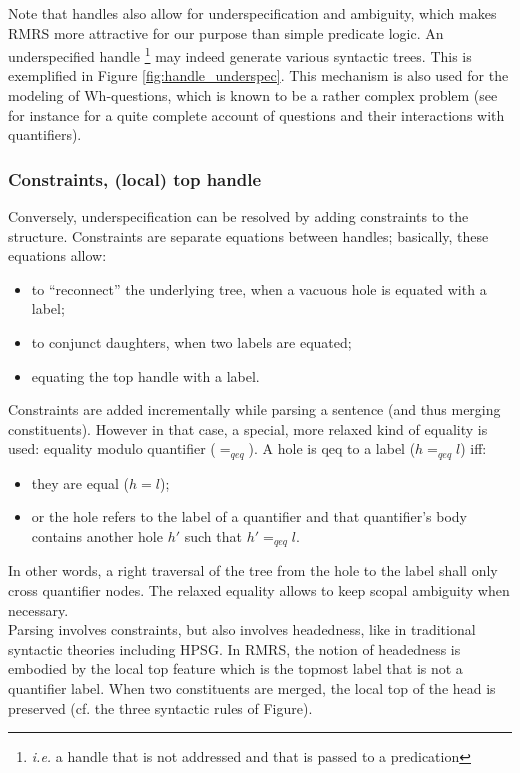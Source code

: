 \documentclass[11pt]{article}
\begin{document}
				Note that handles also allow for underspecification and ambiguity, which makes RMRS more attractive for our purpose than simple predicate logic. An underspecified handle \footnote{\textit{i.e.} a handle that is not addressed and that is passed to a predication} may indeed generate various syntactic trees. This is exemplified in Figure \ref{fig:handle_underspec}. This mechanism is also used for the modeling of Wh-questions, which is known to be a rather complex problem (see for instance \cite{egg1998} for a quite complete account of questions and their interactions with quantifiers).
			\subsubsection{Constraints, (local) top handle}
				Conversely, underspecification can be resolved by adding constraints to the structure. Constraints are separate equations between handles; basically, these equations allow:
				\begin{itemize}
					\item to ``reconnect'' the underlying tree, when a vacuous hole is equated with a label; \vspace{-2mm}
					\item to conjunct daughters, when two labels are equated; \vspace{-2mm}
					\item equating the top handle with a label.
				\end{itemize}
				Constraints are added incrementally while parsing a sentence (and thus merging constituents). However in that case, a special, more relaxed kind of equality is used: equality modulo quantifier ($=_{qeq}$). A hole is qeq to a label ($h=_{qeq}l$) iff:
				\begin{itemize}
					\item they are equal ($h = l$); \vspace{-2mm}
					\item or the hole refers to the label of a quantifier and that quantifier's body contains another hole $h'$ such that $h'=_{qeq} l$.
				\end{itemize}
				In other words, a right traversal of the tree from the hole to the label shall only cross quantifier nodes. The relaxed equality allows to keep scopal ambiguity when necessary.\\
				Parsing involves constraints, but also involves headedness, like in traditional syntactic theories including HPSG. In RMRS, the notion of headedness is embodied by the local top feature which is the topmost label that is not a quantifier label. When two constituents are merged, the local top of the head is preserved (cf. the three syntactic rules of Figure). 
				
\end{document}
